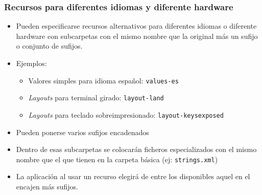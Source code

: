 \documentclass[hyperref={pdfpagelabels=true},ucs]{beamer}
\begin{document}
\begin{frame}[fragile]
\frametitle{Recursos para diferentes idiomas y diferente hardware}

\begin{itemize}
\item Pueden especificarse recursos alternativos para diferentes
  idiomas o diferente hardware con subcarpetas con el mismo nombre que
  la original más un sufijo o conjunto de sufijos.
\item Ejemplos: 
  \begin{itemize}
  \item Valores simples para idioma español: \verb|values-es|
  \item \emph{Layouts} para terminal girado: \verb|layout-land|
  \item \emph{Layouts} para teclado sobreimpresionado:
    \verb|layout-keysexposed|
  \end{itemize}
\item Pueden ponerse varios sufijos encadenados
\item Dentro de esas subcarpetas se colocarán ficheros especializados
  con el mismo nombre que el que tienen en la carpeta básica (ej:
  \verb|strings.xml|)
\item La aplicación al usar un recurso elegirá de entre los
  disponibles aquel en el encajen más sufijos.
\end{itemize}


\end{frame}
\end{document}
